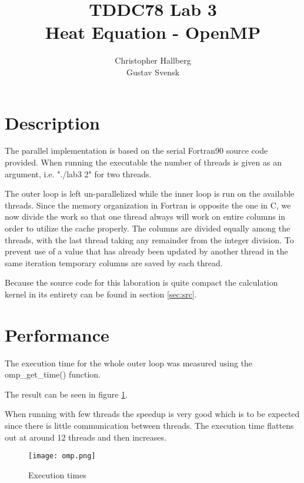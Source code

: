\documentclass[a4paper, 12pt]{article}
\begin{document}
\title{TDDC78 Lab 3\\
        Heat Equation - OpenMP}
\author{Christopher Hallberg \\
        Gustav Svensk}
\maketitle

\thispagestyle{empty}

\newpage
\setcounter{page}{1}
\tableofcontents
\newpage

\section{Description}
The parallel implementation is based on the serial Fortran90 source code
provided. When running the executable the number of threads is given as
an argument, i.e. "./lab3 2" for two threads.

The outer loop is left un-parallelized while the inner loop is run on the
available threads. Since the memory organization in Fortran is opposite the one
in C, we now divide the work so that one thread always will work on entire
columns in order to utilize the cache properly. The columns are divided equally
among the threads, with the last thread taking any remainder from the integer
division. To prevent use of a value that has already been updated by another
thread in the same iteration temporary columns are saved by each thread.

Because the source code for this laboration is quite compact the
calculation kernel in its entirety can be found in section \ref{sec:src}.

\section{Performance}
The execution time for the whole outer loop was measured using the omp\_get\_time() function.

The result can be seen in figure \ref{fig:omp}.

When running with few threads the speedup is very good which is to be expected
since there is little communication between threads. The execution time flattens
out at around 12 threads and then increases.


\begin{figure}[h]
        \centering
        \texttt{[image: omp.png]}
        \caption{Execution times}
        \label{fig:omp}
\end{figure}
\end{document}
